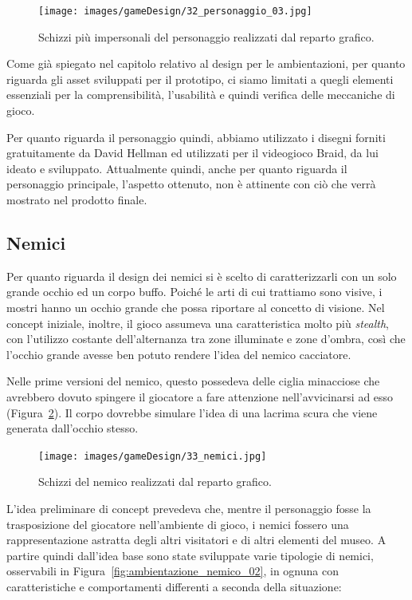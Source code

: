 \begin{figure}%
	\centering
	\texttt{[image: images/gameDesign/32\_personaggio\_03.jpg]}
	\caption{Schizzi più impersonali del personaggio realizzati dal reparto grafico.}
	\label{fig:ambientazione_personaggio_02}
\end{figure}

Come già spiegato nel capitolo relativo al design per le ambientazioni, per quanto riguarda gli asset sviluppati per il prototipo, ci siamo limitati a quegli elementi essenziali per la comprensibilità, l’usabilità e quindi verifica delle meccaniche di gioco.

Per quanto riguarda il personaggio quindi, abbiamo utilizzato i disegni forniti gratuitamente da David Hellman \cite{DavidHellmanSite} ed utilizzati per il videogioco Braid, da lui ideato e sviluppato.
Attualmente quindi, anche per quanto riguarda il personaggio principale, l’aspetto ottenuto, non è attinente con ciò che verrà mostrato nel prodotto finale.

\subsection{Nemici}
\label{sec:nemici}

Per quanto riguarda il design dei nemici si è scelto di caratterizzarli con un solo grande occhio ed un corpo buffo. Poiché le arti di cui trattiamo sono visive, i mostri hanno un occhio grande che possa riportare al concetto di visione. Nel concept iniziale, inoltre, il gioco assumeva una caratteristica molto più \textit{stealth}, con l’utilizzo costante dell’alternanza tra zone illuminate e zone d’ombra, così che l’occhio grande avesse ben potuto rendere l’idea del nemico cacciatore.

Nelle prime versioni del nemico, questo possedeva delle ciglia minacciose che avrebbero dovuto spingere il giocatore a fare attenzione nell’avvicinarsi ad esso (Figura~\ref{fig:ambientazione_nemico_01}).
Il corpo dovrebbe simulare l’idea di una lacrima scura che viene generata dall’occhio stesso.

\begin{figure}%
	\centering
	\texttt{[image: images/gameDesign/33\_nemici.jpg]}
	\caption{Schizzi del nemico realizzati dal reparto grafico.}
	\label{fig:ambientazione_nemico_01}
\end{figure}

L’idea preliminare di concept prevedeva che, mentre il personaggio fosse la trasposizione del giocatore nell’ambiente di gioco, i nemici fossero una rappresentazione astratta degli altri visitatori e di altri elementi del museo.
A partire quindi dall’idea base sono state sviluppate varie tipologie di nemici, osservabili in Figura~\ref{fig:ambientazione_nemico_02}, in ognuna con caratteristiche e comportamenti differenti a seconda della situazione:

